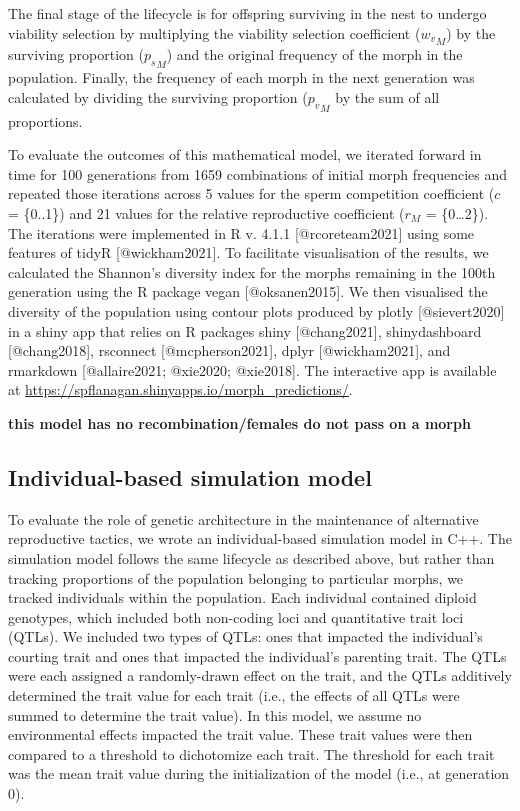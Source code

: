 \documentclass[11pt,]{article}
\begin{document}
The final stage of the lifecycle is for offspring surviving in the nest
to undergo viability selection by multiplying the viability selection
coefficient (\({w_v}_M\)) by the surviving proportion (\({p_s}_M\)) and the
original frequency of the morph in the population. Finally, the frequency of each morph
in the next generation was calculated by dividing the surviving
proportion (\({p_v}_M\) by the sum of all proportions.

To evaluate the outcomes of this mathematical model, we iterated forward
in time for 100 generations from 1659 combinations of initial morph
frequencies and repeated those iterations across 5 values for the sperm
competition coefficient (\(c\) = \{0..1\}) and 21 values for the relative
reproductive coefficient (\(r_M\) = \{0\ldots2\}). The iterations were
implemented in R v. 4.1.1 {[}@rcoreteam2021{]} using some features of tidyR
{[}@wickham2021{]}. To facilitate visualisation of the results, we
calculated the Shannon's diversity index for the morphs remaining in the
100th generation using the R package vegan {[}@oksanen2015{]}. We then
visualised the diversity of the population using contour plots produced
by plotly {[}@sievert2020{]} in a shiny app that relies on R packages shiny
{[}@chang2021{]}, shinydashboard {[}@chang2018{]}, rsconnect {[}@mcpherson2021{]},
dplyr {[}@wickham2021{]}, and rmarkdown {[}@allaire2021; @xie2020; @xie2018{]}.
The interactive app is available at
\url{https://spflanagan.shinyapps.io/morph_predictions/}.

\textbf{this model has no recombination/females do not pass on a morph}

\hypertarget{individual-based-simulation-model}{%
\subsection{Individual-based simulation model}\label{individual-based-simulation-model}}

To evaluate the role of genetic architecture in the maintenance of
alternative reproductive tactics, we wrote an individual-based
simulation model in C++. The simulation model follows the same lifecycle
as described above, but rather than tracking proportions of the
population belonging to particular morphs, we tracked individuals within
the population. Each individual contained diploid genotypes, which
included both non-coding loci and quantitative trait loci (QTLs). We
included two types of QTLs: ones that impacted the individual's courting
trait and ones that impacted the individual's parenting trait. The QTLs
were each assigned a randomly-drawn effect on the trait, and the QTLs
additively determined the trait value for each trait (i.e., the effects
of all QTLs were summed to determine the trait value). In this model, we
assume no environmental effects impacted the trait value. These trait
values were then compared to a threshold to dichotomize each trait. The
threshold for each trait was the mean trait value during the
initialization of the model (i.e., at generation 0).
\end{document}
